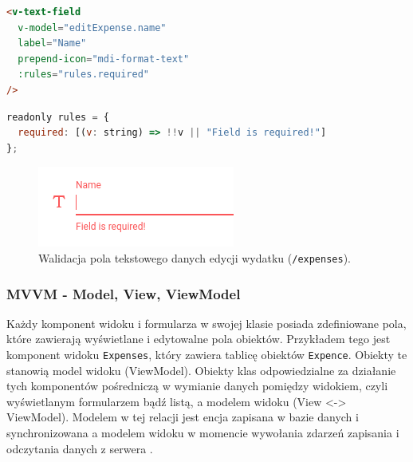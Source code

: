 \begin{lstlisting}[language=HTML, caption={Komponent pola tesktowego}, label=lst:validation]
<v-text-field
  v-model="editExpense.name"
  label="Name"
  prepend-icon="mdi-format-text"
  :rules="rules.required"
/>
\end{lstlisting}
\newpage
\begin{lstlisting}[language=JavaScript, caption={Obiekt reguł walidacji.}, label=lst:validationRules]
readonly rules = {
  required: [(v: string) => !!v || "Field is required!"]
};
\end{lstlisting}

\begin{figure}[H]
  \centering
  \includegraphics[width=0.3\linewidth]{screenshots/validation}
  \caption{Walidacja pola tekstowego danych edycji wydatku (\lstinline{/expenses}).}
  \label{ss:validation}
\end{figure}

\subsubsection{MVVM - Model, View, ViewModel}
Każdy komponent widoku i formularza w swojej klasie posiada zdefiniowane pola, które zawierają wyświetlane i edytowalne pola obiektów. Przykładem tego jest komponent widoku \lstinline{Expenses}, który zawiera tablicę obiektów \lstinline{Expence}. Obiekty te stanowią model widoku (ViewModel). Obiekty klas odpowiedzialne za działanie tych komponentów pośredniczą w wymianie danych pomiędzy widokiem, czyli wyświetlanym formularzem bądź listą, a modelem widoku (View <-> ViewModel). Modelem w tej relacji jest encja zapisana w bazie danych i synchronizowana a modelem widoku w momencie wywołania zdarzeń zapisania i odczytania danych z serwera \cite{mvvm}.